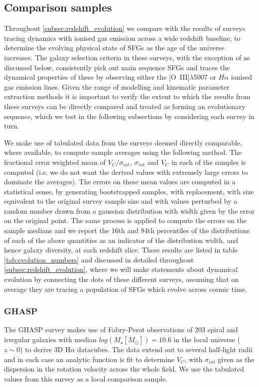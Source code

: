 \documentclass[fleqn,usenatbib]{mn2e}
\begin{document}
\subsection{Comparison samples}\label{subsubsec:comparison_samples}
Throughout \cref{subsec:redshift_evolution} we compare with the results of surveys tracing dynamics with ionised gas emission across a wide redshift baseline, to determine the evolving physical state of SFGs as the age of the universe increases.
The galaxy selection criteria in these surveys, with the exception of \cite{Green2014} as discussed below, consistently pick out main sequence SFGs and traces the dynamical properties of these by observing either the [O~{\sc III}]$\lambda$5007 or $H\alpha$ ionised gas emission lines.
Given the range of modelling and kinematic parameter extraction methods it is important to verify the extent to which the results from these surveys can be directly compared and treated as forming an evolutionary sequence, which we test in the following subsections by considering each survey in turn.

We make use of tabulated data from the surveys deemed directly comparable, where available, to compute sample averages using the following method. 
The fractional error weighted mean of $V_{C}/\sigma_{int}$, $\sigma_{int}$ and $V_{C}$ in each of the samples is computed (i.e. we do not want the derived values with extremely large errors to dominate the averages).
The errors on these mean values are computed in a statistical sense, by generating bootstrapped samples, with replacement, with size equivalent to the original survey sample size and with values perturbed by a random number drawn from a gaussian distribution with width given by the error on the original point.
The same process is applied to compute the errors on the sample medians and we report the 16th and 84th percentiles of the distributions of each of the above quantities as an indicator of the distribution width, and hence galaxy diversity, at each redshift slice.
These results are listed in table \ref{tab:evolution_numbers} and discussed in detailed throughout \cref{subsec:redshift_evolution}, where we will make statements about dynamical evolution by connecting the dots of these different surveys, assuming that on average they are tracing a population of SFGs which evolve across cosmic time. 

\subsubsection{GHASP}\label{subsubsec:GHASP}
The GHASP survey \citep[E08]{Epinat2008,Epinat2008a} makes use of Fabry-Perot observations of 203 spiral and irregular galaxies with median $log(M_{\star}[M_{\odot}])=10.6$ in the local universe ($z\sim0$) to derive 3D H$\alpha$ datacubes.
The data extend out to several half-light radii and in each case an analytic function is fit to determine $V_{C}$, with $\sigma_{int}$ given as the dispersion in the rotation velocity across the whole field.
We use the tabulated values from this survey as a local comparison sample.
\end{document}
